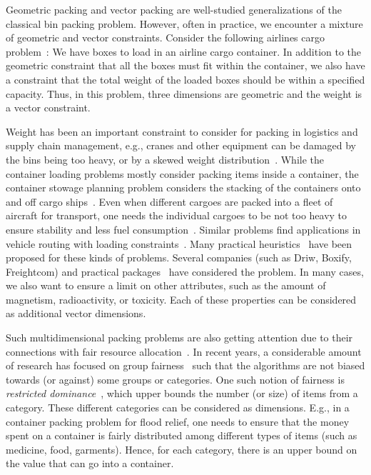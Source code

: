 Geometric packing and vector packing are well-studied generalizations of
the classical bin packing problem.
However, often in practice, we encounter a mixture of geometric and vector constraints.
Consider the following airlines cargo problem~\cite{paquay2016mixed}:
We have boxes to load in an airline cargo container.
In addition to the geometric constraint that all the boxes must fit within the container,
we also have a constraint that the total weight of the loaded boxes
should be within a specified capacity. Thus, in this problem,
three dimensions are geometric and the weight is a vector constraint.

Weight has been an important constraint to consider for packing in logistics and supply chain
management, e.g., cranes and other equipment can be damaged by the bins being too heavy,
or by a skewed weight distribution~\cite{alonso2017mathematical}.
While the container loading problems mostly consider packing items inside a container,
the container stowage planning problem considers the stacking of the containers
onto and off cargo ships~\cite{monaco2014terminal}.
Even when different cargoes are packed into a fleet of aircraft for transport,
one needs the individual cargoes to be not too heavy to ensure stability
and less fuel consumption~\cite{amiouny1992balanced}.
Similar problems find applications in vehicle routing
with loading constraints~\cite{bortfeldt2013constraints}.
Many practical heuristics~\cite{sorset2019heuristic,taylor2017three}
have been proposed for these kinds of problems.
Several companies (such as Driw, Boxify, Freightcom) and practical packages~\cite{yang2017gbp}
have considered the problem. In many cases, we also want to ensure a limit on other attributes,
such as the amount of magnetism, radioactivity, or toxicity.
Each of these properties can be considered as additional vector dimensions.

Such multidimensional packing problems are also getting attention due to their
connections with fair resource allocation~\cite{fairknap}.
In recent years, a considerable amount of research has focused on
group fairness~\cite{JosephKMR16,TsangWRTZ19} such that the algorithms are
not biased towards (or against) some groups or categories.
One such notion of fairness is \emph{restricted dominance}~\cite{BeraCFN19},
which upper bounds the number (or size) of items from a category.
These different categories can be considered as dimensions.
E.g., in a container packing problem for flood relief,
one needs to ensure that the money spent on a container is fairly distributed among
different types of items (such as medicine, food, garments).
Hence, for each category, there is an upper bound on the value that can go into a container.

